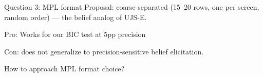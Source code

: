 \documentclass[11pt,aspectratio=169]{beamer}
\begin{document}
\begin{frame}{Question 3: MPL format}
Proposal: coarse separated (15--20 rows, one per screen, random order) --- the belief analog of UJS-E. 

Pro: Works for our BIC test at 5pp precision

Con: does not generalize to precision-sensitive belief elicitation.

\vspace{0.5em}
\begin{block}{}
How to approach MPL format choice?
\end{block}

\end{frame}
\end{document}
